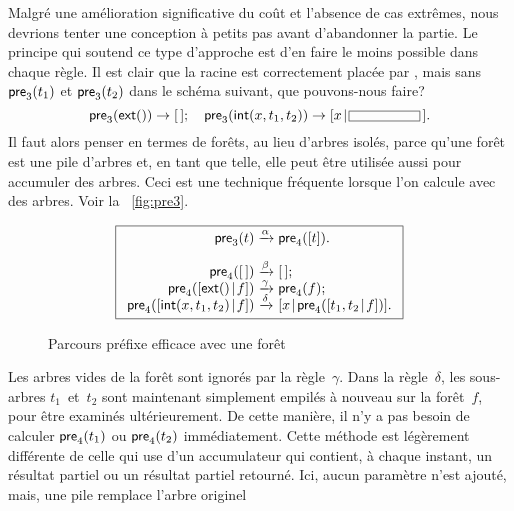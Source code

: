 Malgré une amélioration significative du coût et l'absence de cas
extrêmes, nous devrions tenter une conception à petits
pas avant d'abandonner la partie. Le
principe qui soutend ce type d'approche est d'en faire le moins
possible dans chaque règle. Il est clair que la racine est
correctement placée par
, mais sans
\(\textsf{pre}_3(t_1)\) et
\(\textsf{pre}_3(t_2)\) dans le schéma suivant, que pouvons-nous faire?
\begin{equation*}
\fun{pre}_3(\fun{ext}()) \rightarrow \el;
\quad
\fun{pre}_3(\fun{int}(x,t_1,t_2)) \rightarrow
  \cons{x}{\fbcode{CCCCCCC}\,}.
\end{equation*}
Il faut alors penser en termes de forêts, au lieu
d'arbres isolés, parce qu'une forêt est une pile d'arbres et, en tant
que telle, elle peut être utilisée aussi pour accumuler des
arbres. Ceci est une
technique fréquente lorsque l'on calcule avec des arbres. Voir
la \fig~\vref{fig:pre3}.
\begin{figure}
\begin{equation*}
\boxed{
\begin{array}{r@{\;}c@{\;}l}
\fun{pre}_3(t) & \xrightarrow{\smash{\alpha}} & \fun{pre}_4([t]).\\
\\
\fun{pre}_4(\el) & \xrightarrow{\smash{\beta}} & \el;\\
\fun{pre}_4(\cons{\fun{ext}()}{f})
  & \xrightarrow{\smash{\gamma}} & \fun{pre}_4(f);\\
\fun{pre}_4(\cons{\fun{int}(x,t_1,t_2)}{f})
  & \xrightarrow{\smash{\delta}} &
  \cons{x}{\fun{pre}_4(\cons{t_1,t_2}{f})}.
\end{array}}
\end{equation*}
\caption{Parcours préfixe efficace avec une forêt\label{fig:pre3}}
\end{figure}
Les arbres vides de la forêt sont ignorés par la
règle~\(\gamma\). Dans la règle~\(\delta\), les sous-arbres
\(t_1\)~et~\(t_2\) sont maintenant simplement empilés à nouveau sur la
forêt~\(f\), pour être examinés ultérieurement. De cette manière, il
n'y a pas besoin de calculer
\(\textsf{pre}_4(t_1)\) ou
\(\textsf{pre}_4(t_2)\) immédiatement. Cette méthode est légèrement
différente de celle qui use d'un accumulateur qui contient, à chaque
instant, un résultat partiel ou un résultat partiel retourné. Ici,
aucun paramètre n'est ajouté, mais, une pile remplace l'arbre originel
